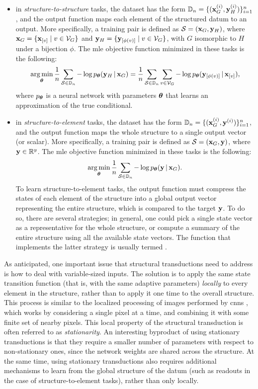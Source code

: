 \begin{itemize}
    \item in \emph{structure-to-structure} tasks, the dataset has the form $\Data_n = \Set{(\Vector{x}_G^{(i)}, \Vector{y}_H^{(i)})}_{i=1}^n$, and the output function maps each element of the structured datum to an output. More specifically, a training pair is defined as $\Cal{S} = (\Vector{x}_G, \Vector{y}_H)$, where $\Vector{x}_G = \Set{\Elem{x}{v} \mid v \in \Cal{V}_G}$ and $\Vector{y}_H = \Set{\Elem{y}{\phi(v)} \mid v \in \Cal{V}_{G}}$, with $G$ isomorphic to $H$ under a bijection $\phi$. The \gls{mle} objective function minimized in these tasks is the following:
    $$\argmin_{\Param} \frac{1}{n} \sum_{\Cal{S} \in \Data_n} - \log p_{\Param}(\Vector{y}_H \given \Vector{x}_G) = \frac{1}{n}\sum_{\Cal{S} \in \Data_n} \sum_{v \in \Cal{V}_G} - \log p_{\Param}(\Elem{y}{\phi(v)} \given \Elem{x}{v}),$$
    where $p_{\boldsymbol{\theta}}$ is a neural network with parameters $\boldsymbol{\theta}$ that learns an approximation of the true conditional.
    \item in \emph{structure-to-element} tasks, the dataset has the form $\Data_n = \Set{(\Vector{x}_G^{(i)}, \Vector{y}^{(i)})}_{i=1}^n$, and the output function maps the whole structure to a single output vector (or scalar). More specifically, a training pair is defined as $\Cal{S} = (\Vector{x}_G, \Vector{y})$, where $\Vector{y} \in \Real^y$. The \gls{mle} objective function minimized in these tasks is the following:
    $$\argmin_{\Param} \frac{1}{n} \sum_{\Cal{S} \in \Data_n} - \log p_{\Param}(\Vector{y} \given \Vector{x}_G).$$
    To learn structure-to-element tasks, the output function must compress the states of each element of the structure into a global output vector representing the entire structure, which is compared to the target $\Vector{y}$. To do so, there are several strategies; in general, one could pick a single state vector as a representative for the whole structure, or compute a summary of the entire structure using all the available state vectors. The function that implements the latter strategy is usually termed . 
\end{itemize}

As anticipated, one important issue that structural transductions need to address is how to deal with variable-sized inputs. The solution is to apply the same state transition function (that is, with the same adaptive parameters) \emph{locally} to every element in the structure, rather than to apply it one time to the overall structure. This process is similar to the localized processing of images performed by \glspl{cnn} \cite{?}, which works by considering a single pixel at a time, and combining it with some finite set of nearby pixels. This local property of the structural transduction is often referred to as \emph{stationarity}. An interesting byproduct of using stationary transductions is that they require a smaller number of parameters with respect to non-stationary ones, since the network weights are shared across the structure. At the same time, using stationary transductions also requires additional mechanisms to learn from the global structure of the datum (such as readouts in the case of structure-to-element tasks), rather than only locally.

